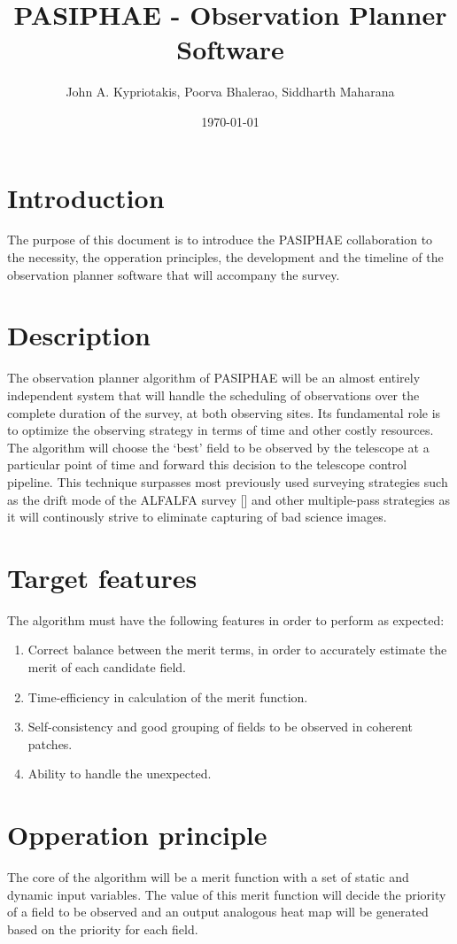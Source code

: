 \documentclass{article}
\title{PASIPHAE - Observation Planner Software}
\author{John A. Kypriotakis, Poorva Bhalerao, Siddharth Maharana}
\date{\today}
\begin{document}
\maketitle

\section{Introduction}
The purpose of this document is to introduce the PASIPHAE collaboration to the necessity, the opperation principles, the development and the timeline of the observation planner software that will accompany the survey.

\section{Description}
The observation planner algorithm of PASIPHAE will be an almost entirely independent system that will handle the scheduling of observations over the complete duration of the survey, at both observing sites. Its fundamental role is to optimize the observing strategy in terms of time and other costly resources. The algorithm will choose the ‘best’ field to be observed by the telescope at a particular point of time and forward this decision to the telescope control pipeline. This technique surpasses most previously used surveying strategies such as the drift mode of the ALFALFA survey [\cite{Giovanelli2005}] and other multiple-pass strategies as it will continously strive to eliminate capturing of bad science images. 

\section{Target features}
The algorithm must have the following features in order to perform as expected:
\begin{enumerate}
\item Correct balance between the merit terms, in order to accurately estimate the merit of each candidate field.
\item Time-efficiency in calculation of the merit function.
\item Self-consistency and good grouping of fields to be observed in coherent patches.
\item Ability to handle the unexpected.
\end{enumerate}

\section{Opperation principle}
The core of the algorithm will be a merit function with a set of static and dynamic input variables. The value of this merit function will decide the priority of a field to be observed and an output analogous heat map will be generated based on the priority for each field.
\end{document}
